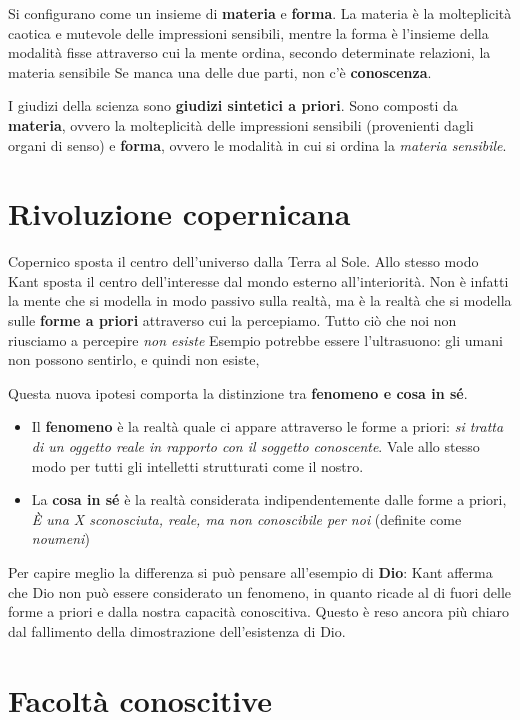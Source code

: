 \documentclass[a4paper, twoside, titlepage]{book}
\begin{document}
Si configurano come un insieme di \textbf{materia} e \textbf{forma}. 
La materia è la molteplicità caotica e mutevole delle impressioni sensibili, mentre la forma è l’insieme della modalità fisse attraverso cui la mente ordina, secondo determinate relazioni, la materia sensibile
Se manca una delle due parti, non c’è \textbf{conoscenza}.

I giudizi della scienza sono \textbf{giudizi sintetici a priori}. Sono composti da \textbf{materia}, ovvero la molteplicità delle impressioni sensibili (provenienti dagli organi di senso) e \textbf{forma}, ovvero le modalità in cui si ordina la \textit{materia sensibile}.

\section{Rivoluzione copernicana}

Copernico sposta il centro dell’universo dalla Terra al Sole. Allo stesso modo Kant sposta il centro dell’interesse dal mondo esterno all’interiorità.
Non è infatti la mente che si modella in modo passivo sulla realtà, ma è la realtà che si modella sulle \textbf{forme a priori} attraverso cui la percepiamo.
Tutto ciò che noi non riusciamo a percepire \textit{non esiste}
Esempio potrebbe essere l’ultrasuono: gli umani non possono sentirlo, e quindi non esiste,

Questa nuova ipotesi comporta la distinzione tra \textbf{fenomeno e cosa in sé}.
\begin{itemize}
\item Il \textbf{fenomeno} è la realtà quale ci appare attraverso le forme a priori: \textit{si tratta di un oggetto reale in rapporto con il soggetto conoscente}. Vale allo stesso modo per tutti gli intelletti strutturati come il nostro.
\item La \textbf{cosa in sé} è la realtà considerata indipendentemente dalle forme a priori, \textit{È una X sconosciuta, reale, ma non conoscibile per noi} (definite come \textit{noumeni})
\end{itemize}

Per capire meglio la differenza si può pensare all’esempio di \textbf{Dio}: Kant afferma che Dio non può essere considerato un fenomeno, in quanto ricade al di fuori delle forme a priori e dalla nostra capacità conoscitiva.
Questo è reso ancora più chiaro dal fallimento della dimostrazione dell’esistenza di Dio.

\section{Facoltà conoscitive}
\end{document}
